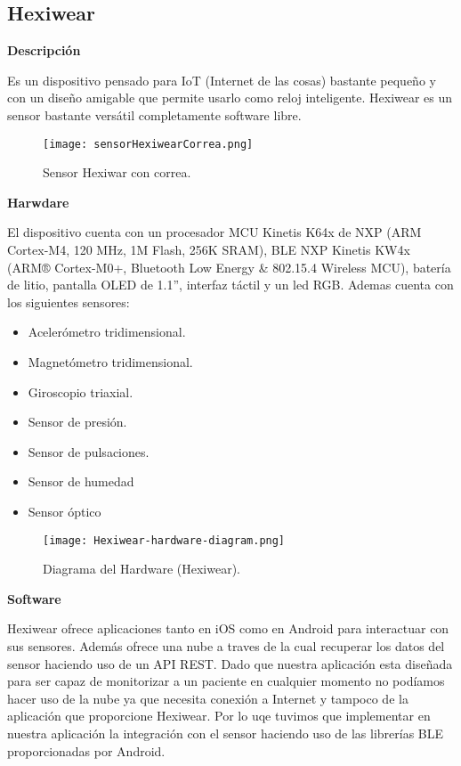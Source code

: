 \documentclass[11pt,spanish]{article}
\begin{document}
\subsection{Hexiwear}
{\bf Descripción}
\newline

Es un dispositivo pensado para IoT (Internet de las cosas) bastante pequeño y con un diseño amigable que permite usarlo como reloj inteligente. Hexiwear es un sensor bastante versátil completamente software libre.
\newline

\begin{figure}[h!]
  \centering
  \texttt{[image: sensorHexiwearCorrea.png]}
  \caption{Sensor Hexiwar con correa.}
\end{figure}
\newpage

{\bf Harwdare}
\newline

El dispositivo cuenta con un procesador MCU Kinetis K64x de NXP (ARM Cortex-M4, 120 MHz, 1M Flash, 256K SRAM), BLE NXP Kinetis KW4x (ARM® Cortex-M0+, Bluetooth Low Energy \& 802.15.4 Wireless MCU), batería de litio, pantalla OLED
de 1.1'', interfaz táctil y un led RGB. Ademas cuenta con los siguientes sensores:

\begin{itemize}
  \item Acelerómetro tridimensional.
  \item Magnetómetro tridimensional.
  \item Giroscopio triaxial.
  \item Sensor de presión.
  \item Sensor de pulsaciones.
  \item Sensor de humedad
  \item Sensor óptico
\end{itemize}

\begin{figure}[H]
  \centering
  \texttt{[image: Hexiwear-hardware-diagram.png]}
  \caption{Diagrama del Hardware (Hexiwear).}
\end{figure}

{\bf Software}
\newline

Hexiwear ofrece aplicaciones tanto en iOS como en Android para interactuar con sus sensores. Además ofrece una nube a traves de la cual recuperar los datos del sensor haciendo uso de un API REST. Dado que nuestra aplicación esta diseñada para ser capaz de monitorizar a un paciente en cualquier momento no podíamos hacer uso de la nube ya que necesita conexión a Internet y tampoco de la aplicación que proporcione Hexiwear.  Por lo uqe tuvimos que implementar en nuestra aplicación la integración con el sensor haciendo uso de las librerías BLE proporcionadas por Android.
\newline
\end{document}
